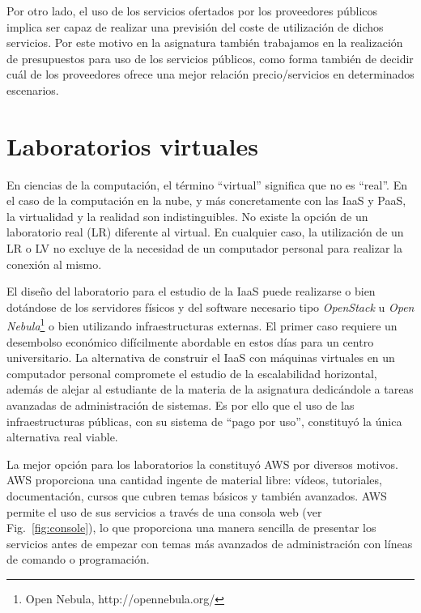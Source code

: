 \documentclass[conference]{IEEEtran}
\begin{document}
Por otro lado, el uso de los servicios ofertados por los proveedores públicos implica ser capaz de 
realizar una previsión del coste de utilización de dichos servicios. Por este motivo en la asignatura también 
trabajamos en la realización de presupuestos para uso de los servicios públicos, como forma
también de decidir cuál de los proveedores ofrece una mejor relación precio/servicios en determinados 
escenarios.


\section{Laboratorios virtuales \label{sec:laboratorios_virtuales}}

En ciencias de la computación, el término ``virtual'' significa que no es ``real''.
En el caso de la computación en la nube, y más concretamente con las IaaS y PaaS, la virtualidad y la realidad son indistinguibles.
No existe la opción de un laboratorio real (LR) diferente al virtual. En cualquier caso, la utilización de un LR o LV no 
excluye de la necesidad de un computador personal para realizar la conexión al mismo.

El diseño del laboratorio para el estudio de la IaaS  puede realizarse
o bien dotándose de los servidores físicos y del software necesario tipo \textit{OpenStack} \cite{Pepple:2011} u \textit{Open Nebula}\footnote{Open Nebula, http://opennebula.org/}
o bien utilizando infraestructuras externas.
El primer caso requiere un desembolso económico difícilmente abordable en estos días para un centro universitario.
La alternativa de construir el IaaS con máquinas virtuales en un computador personal compromete el estudio de la 
escalabilidad horizontal, además de  alejar al estudiante de la materia de la asignatura dedicándole a tareas 
avanzadas de administración de sistemas. Es por ello que el uso de las infraestructuras públicas, con su sistema 
de ``pago por uso'', constituyó la única alternativa real viable.


La mejor opción para los laboratorios la constituyó AWS por diversos motivos.
AWS proporciona una cantidad ingente de material libre: vídeos, tutoriales, documentación, cursos que cubren temas básicos y también avanzados.
AWS permite el uso de sus servicios a través de una consola web (ver Fig.~\ref{fig:console}), lo que proporciona una  manera sencilla de presentar
los servicios antes de empezar con temas más avanzados de administración con líneas de comando o programación.
\end{document}
